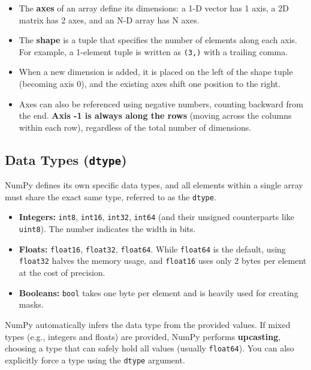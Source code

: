 \begin{itemize}
    \item The \textbf{axes} of an array define its dimensions: a 1-D vector has 1 axis, a 2D matrix has 2 axes, and an N-D array has N axes.
    \item The \textbf{shape} is a tuple that specifies the number of elements along each axis. For example, a 1-element tuple is written as \texttt{(3,)} with a trailing comma.
    \item When a new dimension is added, it is placed on the left of the shape tuple (becoming axis 0), and the existing axes shift one position to the right.
    \item Axes can also be referenced using negative numbers, counting backward from the end. \textbf{Axis -1 is always along the rows} (moving across the columns within each row), regardless of the total number of dimensions.
\end{itemize}

\subsection{Data Types (\texttt{dtype})}
NumPy defines its own specific data types, and all elements within a single array must share the exact same type, referred to as the \texttt{dtype}.
\begin{itemize}
    \item \textbf{Integers:} \texttt{int8}, \texttt{int16}, \texttt{int32}, \texttt{int64} (and their unsigned counterparts like \texttt{uint8}). The number indicates the width in bits.
    \item \textbf{Floats:} \texttt{float16}, \texttt{float32}, \texttt{float64}. While \texttt{float64} is the default, using \texttt{float32} halves the memory usage, and \texttt{float16} uses only 2 bytes per element at the cost of precision.
    \item \textbf{Booleans:} \texttt{bool} takes one byte per element and is heavily used for creating masks.
\end{itemize}

NumPy automatically infers the data type from the provided values. If mixed types (e.g., integers and floats) are provided, NumPy performs \textbf{upcasting}, choosing a type that can safely hold all values (usually \texttt{float64}). You can also explicitly force a type using the \texttt{dtype} argument.



